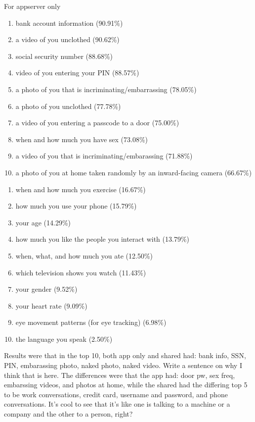 \documentclass{acm_proc_article-sp}
\begin{document}
For appserver only  \\[-.8cm]

\begin{enumerate} \itemsep1pt \parskip0pt 
  \item bank account information (90.91\%)
  \item a video of you unclothed (90.62\%)
  \item social security number (88.68\%)
  \item video of you entering your PIN (88.57\%)
  \item a photo of you that is incriminating/embarrassing (78.05\%)
  \item a photo of you unclothed (77.78\%)
  \item a video of you entering a passcode to a door (75.00\%)
  \item when and how much you have sex (73.08\%)
  \item a video of you that is incriminating/embarassing (71.88\%)
  \item a photo of you at home taken randomly by an inward-facing camera (66.67\%)  \\[-.8cm]
\end{enumerate}

\begin{enumerate} \itemsep1pt \parskip0pt 
  \setcounter{enumi}{63}
  \item when and how much you exercise (16.67\%)
  \item how much you use your phone (15.79\%)
  \item your age (14.29\%)
  \item how much you like the people you interact with (13.79\%)
  \item when, what, and how much you ate (12.50\%)
  \item which television shows you watch (11.43\%)
  \item your gender (9.52\%)
  \item your heart rate (9.09\%)
  \item eye movement patterns (for eye tracking) (6.98\%)
  \item the language you speak (2.50\%)\\[-.8cm]
\end{enumerate}

Results were that in the top 10, both app only and shared had: bank info, SSN, PIN, embarassing photo, naked photo, naked video. Write a sentence on why I think that is here. The differences were that the app had: door pw, sex freq, embarssing videos, and photos at home, while the shared had the differing top 5 to be work conversations, credit card, username and password,  and phone conversations. It's cool to see that it's like one is talking to a machine or a company and the other to a person, right? 
\end{document}
